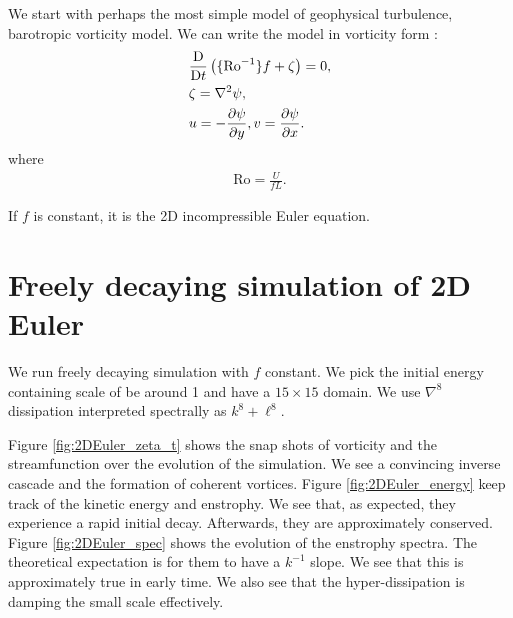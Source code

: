 \graphicspath{{Baro_vort/code/plot_snap/figs/}}

We start with perhaps the most simple model of geophysical turbulence, barotropic vorticity model. We can write the model in vorticity form \parencite[\S 4.2.1]{Vallis_17}:
\begin{align}
    &\frac{\mathrm{D}}{\mathrm{D} t}\left( \{\text{Ro}^{-1}\}f+\zeta \right) = 0,\\
    &\zeta = \nabla^2\psi,\\
    &u = -\frac{\partial\psi}{\partial y}, v = \frac{\partial\psi}{\partial x}.
\end{align}
where
\begin{align}
    \text{Ro} = \frac{U}{fL}.
\end{align}

If $f$ is constant, it is the 2D incompressible Euler equation. 

\section{Freely decaying simulation of 2D Euler}
We run freely decaying simulation with $f$ constant. We pick the initial energy containing scale of be around 1 and have a $15\times 15$ domain. We use $\nabla^8$ dissipation interpreted spectrally as $k^8+\ell^8$. 

Figure \ref{fig:2DEuler_zeta_t} shows the snap shots of vorticity and the streamfunction over the evolution of the simulation. We see a convincing inverse cascade and the formation of coherent vortices. Figure \ref{fig:2DEuler_energy} keep track of the kinetic energy and enstrophy. We see that, as expected, they experience a rapid initial decay. Afterwards, they are approximately conserved. Figure \ref{fig:2DEuler_spec} shows the evolution of the enstrophy spectra. The theoretical expectation is for them to have a $k^{-1}$ slope. We see that this is approximately true in early time. We also see that the hyper-dissipation is damping the small scale effectively.

